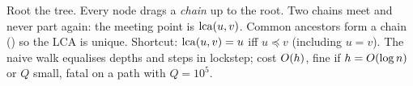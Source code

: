 \begin{recallbox}
Root the tree.  Every node drags a \emph{chain} up to the root.  Two
chains meet and never part again: the meeting point is \(\operatorname{lca}(u,v)\).
Common ancestors form a chain () so the LCA is unique.
Shortcut: \(\operatorname{lca}(u,v)=u\) iff \(u \preceq v\) (including \(u=v\)).  The
naive walk equalises depths and steps in lockstep; cost \(O(h)\), fine
if \(h = O(\log n)\) or \(Q\) small, fatal on a path with \(Q=10^5\).
\end{recallbox}
